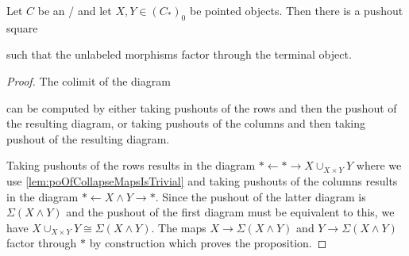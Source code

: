 \begin{lemma}\label{lem:poSqWithFactoringTerminal}
    Let $C$ be an \inftytop/ and let $X,Y\in \left(C_*\right)_0$ be pointed objects. 
    Then there is a pushout square
    \begin{center}
    \end{center}
    such that the unlabeled morphisms factor through the terminal object.
    \begin{proof}
        The colimit of the diagram 
        \begin{center}
        \end{center}
        can be computed by either taking pushouts of the rows and then the pushout of the resulting diagram, or taking pushouts of the columns and then taking pushout of the resulting diagram.
        
        Taking pushouts of the rows results in the diagram $*\xleftarrow{}*\rightarrow X\cup_{X\times Y} Y$ where we use \cref{lem:poOfCollapseMapsIsTrivial} and taking pushouts of the columns results in the diagram $*\xleftarrow{}X\wedge Y\rightarrow *$. 
        Since the pushout of the latter diagram is $\Sigma\left(X\wedge Y\right)$ and the pushout of the first diagram must be equivalent to this, we have $X\cup_{X\times Y} Y\cong\Sigma\left(X\wedge Y\right)$.
        The maps $X\to\Sigma\left(X\wedge Y\right)$ and $Y\to\Sigma\left(X\wedge Y\right)$ factor through $*$ by construction which proves the proposition.
    \end{proof}
\end{lemma}
